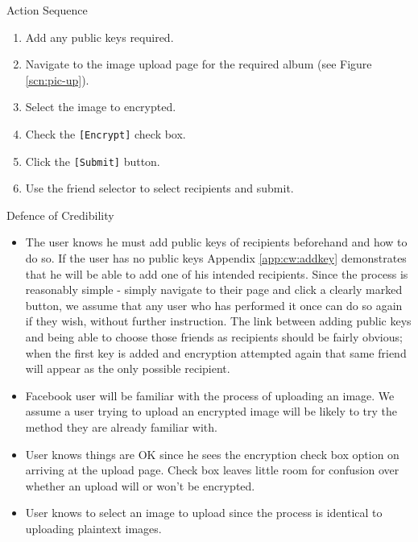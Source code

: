 \begin{desc}

    \item[Action Sequence] \hfill
    \begin{enumerate}
        \item Add any public keys required.
        \item Navigate to the image upload page for the required album (see Figure \ref{scn:pic-up}).
        \item Select the image to encrypted.
        \item Check the {\tt [Encrypt]} check box.
        \item Click the {\tt [Submit]} button.
        \item Use the friend selector to select recipients and submit.
    \end{enumerate}
    
    \item[Defence of Credibility] \hfill
        \begin{itemize}
            
            \item The user knows he must add public keys of recipients beforehand and how to do so. If the user has no public keys Appendix \ref{app:cw:addkey} demonstrates that he will be able to add one of his intended recipients. Since the process is reasonably simple - simply navigate to their page and click a clearly marked button, we assume that any user who has performed it once can do so again if they wish, without further instruction. The link between adding public keys and being able to choose those friends as recipients should be fairly obvious; when the first key is added and encryption attempted again that same friend will appear as the only possible recipient.
            
            \item Facebook user will be familiar with the process of uploading an image. We assume a user trying to upload an encrypted image will be likely to try the method they are already familiar with.
            
            \item User knows things are OK since he sees the encryption check box option on arriving at the upload page. Check box leaves little room for confusion over whether an upload will or won't be encrypted.
            
            \item User knows to select an image to upload since the process is identical to uploading plaintext images.
            

\end{itemize}
\end{desc}
